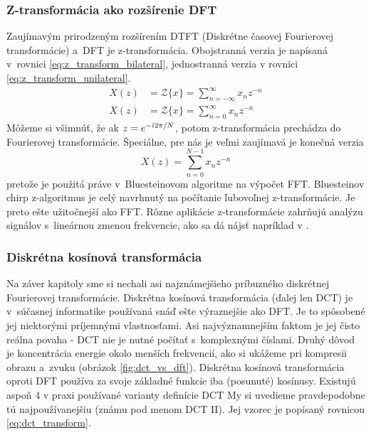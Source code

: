\subsubsection{Z-transformácia ako rozšírenie DFT}
Zaujímavým prirodzeným rozšírením DTFT (Diskrétne časovej Fourierovej
transformácie) a~DFT je z-transformácia. Obojstranná verzia je
napísaná v~rovnici \eqref{eq:z_transform_bilateral}, jednostranná verzia
v rovnici \eqref{eq:z_transform_unilateral}.
\begin{align}
    \label{eq:z_transform_bilateral}
    X(z) &= \mathcal{Z}\{x\} = \sum_{n=-\infty}^{\infty} x_n z^{-n} \\
    \label{eq:z_transform_unilateral}
    X(z) &= \mathcal{Z}\{x\} = \sum_{n=0}^{\infty} x_n z^{-n}
\end{align}
Môžeme si všimnúť, že ak $z=e^{-\hat{\imath} 2 \pi/N}$, potom z-transformácia prechádza do
Fourierovej transformácie.
Špeciálne, pre nás je veľmi zaujímavá je konečná verzia
\begin{equation*}
 X(z) = \sum_{n=0}^{N-1} x_n z^{-n}
\end{equation*}
pretože je použitá práve v~Bluesteinovom algoritme na výpočet FFT.
Bluesteinov chirp z-algoritmus je celý navrhnutý na počítanie
ľubovoľnej z-transformácie. Je preto ešte užitočnejší ako FFT. Rôzne
aplikácie z-transformácie zahrňujú analýzu signálov s~lineárnou zmenou
frekvencie, ako sa dá nájsť napríklad v \cite{nasa}.

\subsubsection{Diskrétna kosínová transformácia}
Na záver kapitoly sme si nechali asi najznámejšieho príbuzného
diskrétnej Fourierovej transformácie. Diskrétna kosínová transformácia
(ďalej len DCT) je v~súčasnej informatike používaná snáď ešte
výraznejšie ako DFT. Je to spôsobené jej niektorými príjemnými
vlastnosťami. Asi najvýznamnejším faktom je jej čisto reálna
povaha - DCT nie je nutné počítať s~komplexnými číslami.
Druhý dôvod je koncentrácia energie okolo menších frekvencií, ako si
ukážeme pri kompresii obrazu a~zvuku (obrázok \ref{fig:dct_vs_dft}).
Diskrétna kosínová transformácia oproti DFT používa za svoje
základné funkcie iba (posunuté) kosínusy.
Existujú aspoň 4 v praxi používané varianty definície DCT
My si uvedieme pravdepodobne tú najpoužívanejšiu (známu pod
menom DCT II). Jej vzorec je popísaný rovnicou
\eqref{eq:dct_transform}.

